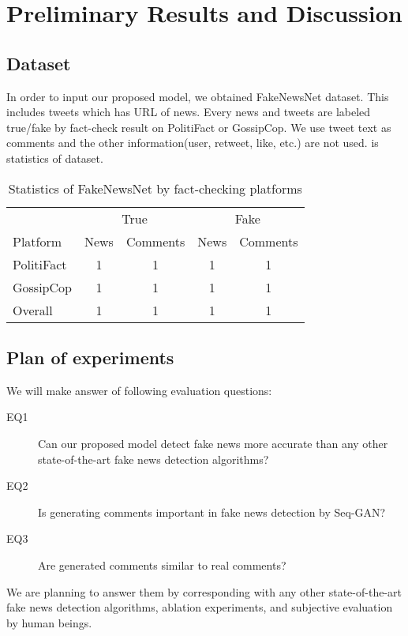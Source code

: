\section{Preliminary Results and Discussion}
\subsection{Dataset}
In order to input our proposed model, we obtained FakeNewsNet\cite{shu2017exploiting,shu2017fake,shu2018fakenewsnet} dataset.
This includes tweets which has URL of news.
Every news and tweets are labeled true/fake by fact-check result on PolitiFact or GossipCop.
We use tweet text as comments and the other information(user, retweet, like, etc.) are not used.
 is statistics of dataset.

\begin{table}[htp]
    \centering
    \caption{Statistics of FakeNewsNet by fact-checking platforms}
    \label{table:fakenewsnet}
    \begin{tabular}{lcccc}
        \hline 
        & \multicolumn{2}{c}{True} & \multicolumn{2}{c}{Fake} \\
        Platform & News & Comments & News & Comments \\
        \hline \hline 
        PolitiFact & 1 & 1 & 1 & 1 \\
        GossipCop & 1 & 1 & 1 & 1 \\
        \hline 
        Overall & 1 & 1 & 1 & 1 \\
        \hline 
    \end{tabular}
\end{table}

\subsection{Plan of experiments}
We will make answer of following evaluation questions:
\begin{description}
    \item[EQ1] Can our proposed model detect fake news more accurate than any other state-of-the-art fake news detection algorithms?
    \item[EQ2] Is generating comments important in fake news detection by Seq-GAN?
    \item[EQ3] Are generated comments similar to real comments?
\end{description}

We are planning to answer them by corresponding with any other state-of-the-art fake news detection algorithms,
ablation experiments, and subjective evaluation by human beings.